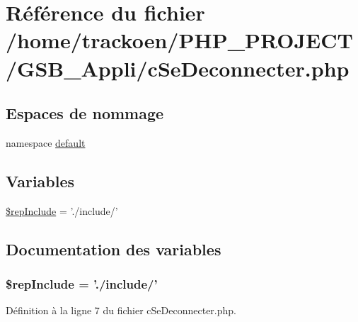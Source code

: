 \hypertarget{c_se_deconnecter_8php}{\section{Référence du fichier /home/trackoen/\-P\-H\-P\-\_\-\-P\-R\-O\-J\-E\-C\-T/\-G\-S\-B\-\_\-\-Appli/c\-Se\-Deconnecter.php}
\label{c_se_deconnecter_8php}
}
\subsection*{Espaces de nommage}
\begin{DoxyCompactItemize}
\item 
namespace \hyperlink{namespacedefault}{default}
\end{DoxyCompactItemize}
\subsection*{Variables}
\begin{DoxyCompactItemize}
\item 
\hyperlink{c_se_deconnecter_8php_aad2a80747c2de66b59cb18d493ae7a8b}{\$rep\-Include} = './include/'
\end{DoxyCompactItemize}


\subsection{Documentation des variables}
\hypertarget{c_se_deconnecter_8php_aad2a80747c2de66b59cb18d493ae7a8b}{
\subsubsection[{\$rep\-Include}]{\setlength{\rightskip}{0pt plus 5cm}\$rep\-Include = './include/'}}\label{c_se_deconnecter_8php_aad2a80747c2de66b59cb18d493ae7a8b}


Définition à la ligne 7 du fichier c\-Se\-Deconnecter.\-php.

